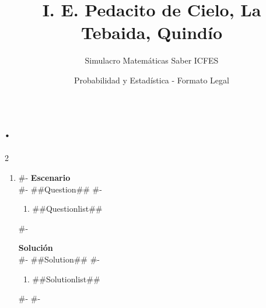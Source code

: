 \documentclass[11pt]{article}
\title{I. E. Pedacito de Cielo, La Tebaida, Quindío}
\author{Simulacro Matemáticas Saber ICFES}
\date{Probabilidad y Estadística - Formato Legal}
\begin{document}
\maketitle

\section*{.}

\begin{multicols}{2}

\begin{enumerate}[label=\arabic*.]
#-
  \item
#-
  \textbf{Escenario}\\
#-
  ##Question##
#-
  \begin{enumerate}[label=(\alph*)]
    \item ##Questionlist##
  \end{enumerate}
#-

  \textbf{Solución}\\
#-
  ##Solution##
#-
  \begin{enumerate}[label=(\alph*)]
    \item ##Solutionlist##
  \end{enumerate}
#-
#-
\end{enumerate}

\end{multicols}
\end{document}
